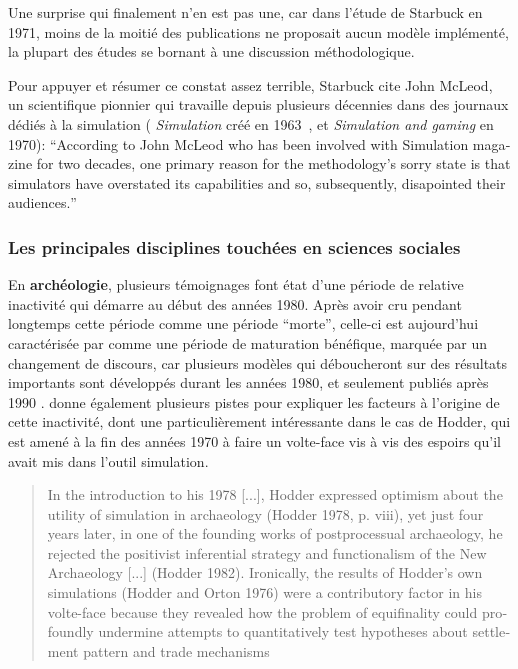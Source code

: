 Une surprise qui finalement n'en est pas une, car dans l'étude de Starbuck en 1971, moins de la moitié des publications ne proposait aucun modèle implémenté, la plupart des études se bornant à une discussion méthodologique.

Pour appuyer et résumer ce constat assez terrible, Starbuck cite John McLeod, un scientifique pionnier qui travaille depuis plusieurs décennies dans des journaux dédiés à la simulation ( \textit{Simulation} créé en 1963 , et \textit{Simulation and gaming} en 1970): \foreignquote{english}{According to  John McLeod who has been involved with Simulation magazine for two decades, one primary reason for the methodology's sorry state is that simulators have overstated its capabilities and so, subsequently, disapointed their audiences.}

\subsubsection{Les principales disciplines touchées en sciences sociales}
\label{ssec:disciplines_touches}

En \textbf{archéologie}, plusieurs témoignages \autocite[6-7]{Lake2013} font état d'une période de relative inactivité  qui démarre au début des années 1980. Après avoir cru pendant longtemps cette période comme une période \enquote{morte}, celle-ci est aujourd'hui caractérisée par \textcite{Lake2013} comme une période de maturation bénéfique, marquée par un changement de discours, car plusieurs modèles qui déboucheront sur des résultats importants sont développés durant les années 1980, et seulement publiés après 1990 . \textcite{Lake2013} donne également plusieurs pistes pour expliquer les facteurs à l'origine de cette inactivité, dont une particulièrement intéressante dans le cas de Hodder, qui est amené à la fin des années 1970 à faire un volte-face vis à vis des espoirs qu'il avait mis dans l'outil simulation.

\foreignblockquote{english}[{\cite[7]{Lake2013}}]{In the introduction to his 1978 [...], Hodder expressed optimism about the utility of simulation in archaeology (Hodder 1978, p. viii), yet just four years later, in one of the founding works of postprocessual archaeology, he rejected the positivist inferential strategy and functionalism of the New Archaeology [...] (Hodder 1982). Ironically, the results of Hodder's own simulations (Hodder and Orton 1976) were a contributory factor in his volte-face because they revealed how the problem of equifinality could profoundly undermine attempts to quantitatively test hypotheses about settlement pattern and trade mechanisms}


